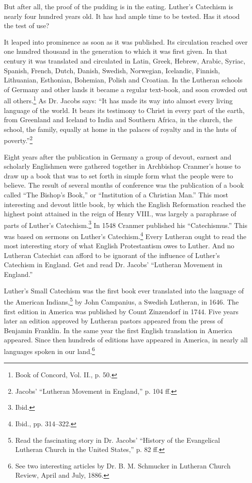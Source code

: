 But after all, the proof of the pudding is in the eating. Luther’s Catechism is nearly four hundred years old. It has had ample time to be tested.  Has it stood the test of use?

It leaped into prominence as soon as it was published.  Its circulation reached over one hundred thousand in the generation to which it was first given. In that century it was translated and circulated in Latin, Greek, Hebrew, Arabic, Syriac, Spanish, French, Dutch, Danish, Swedish, Norwegian, Icelandic, Finnish, Lithuanian, Esthonian, Bohemian, Polish and Croatian. In the Lutheran schools of Germany and other lands it became a
regular text-book, and soon crowded out all others.\footnote{Book of Concord, Vol. II., p. 50.} As Dr. Jacobs says: “It has made its way into almost every living language of the world. It bears its testimony to Christ in every part of the earth, from Greenland and Iceland to India and Southern Africa, in the church, the school, the family, equally at home in the palaces of royalty and in the huts of poverty.”\footnote{Jacobs’ “Lutheran Movement in England,” p. 104 ff.}

Eight years after the publication in Germany a group of devout, earnest and scholarly Englishmen were gathered together in Archbishop Cranmer’s house to draw up a book that was to set forth in simple form what the people were to believe. The result of several months of conference was the publication of a book called “The Bishop’s Book,” or “Institution of a Christian Man.” This most interesting and devout little book, by which the English Reformation reached the highest point attained in the reign of Henry VIII., was largely a paraphrase of parts of Luther’s Catechism.\footnote{Ibid.} In 1548 Cranmer published his “Catechismus.” This was based on sermons on Luther’s Catechism.\footnote{Ibid., pp. 314–322.}  Every Lutheran ought to read the most interesting story of what English Protestantism owes to Luther. And no Lutheran Catechist can afford to be ignorant
of the influence of Luther’s Catechism in England. Get and read Dr. Jacobs’ “Lutheran Movement in England.”

 Luther’s Small Catechism was the first book ever translated into the language of the American Indians,\footnote{Read the fascinating story in Dr. Jacobs’ “History of the Evangelical Lutheran Church in the United States,” p. 82 ff.} by John Campanius, a Swedish Lutheran, in 1646. The first edition in America was published by Count Zinzendorf in 1744. Five years later an edition approved by Lutheran pastors appeared from the press of Benjamin Franklin. In the same year the first English translation in America appeared. Since then hundreds of editions have appeared in America, in nearly all languages spoken in our land.\footnote{See two interesting articles by Dr. B. M. Schmucker in Lutheran Church Review, April and July, 1886.}

